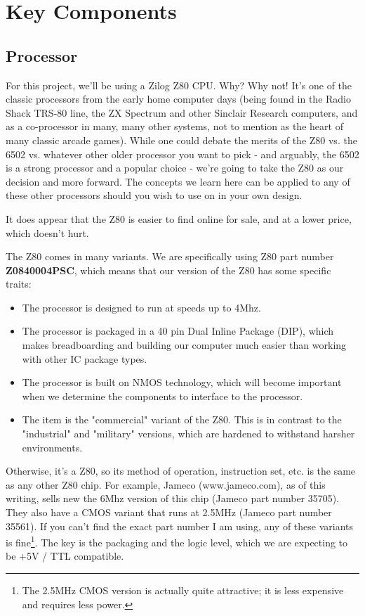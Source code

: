 \section{Key Components}

\subsection{Processor}
For this project, we'll be using a Zilog Z80 CPU. Why? Why not! It's one of the classic processors from the early home computer days (being found in the Radio Shack TRS-80 line, the ZX Spectrum and other Sinclair Research computers, and as a co-processor in many, many other systems, not to mention as the heart of many classic arcade games). While one could debate the merits of the Z80 vs. the 6502 vs. whatever other older processor you want to pick - and arguably, the 6502 is a strong processor and a popular choice - we're going to take the Z80 as our decision and more forward. The concepts we learn here can be applied to any of these other processors should you wish to use on in your own design.

It does appear that the Z80 is easier to find online for sale, and at a lower price, which doesn't hurt. 

The Z80 comes in many variants. We are specifically using Z80 part number \textbf{Z0840004PSC}, which means that our version of the Z80 has some specific traits:

\begin{itemize}
\item The processor is designed to run at speeds up to 4Mhz.
\item The processor is packaged in a 40 pin Dual Inline Package (DIP), which makes breadboarding and building our computer much easier than working with other IC package types.
\item The processor is built on NMOS technology, which will become important when we determine the components to interface to the processor.
\item The item is the "commercial" variant of the Z80. This is in contrast to the "industrial" and "military" versions, which are hardened to withstand harsher environments.
\end{itemize}

Otherwise, it's a Z80, so its method of operation, instruction set, etc. is the same as any other Z80 chip. For example, Jameco (www.jameco.com), as of this writing, sells new the 6Mhz version of this chip (Jameco part number 35705). They also have a CMOS variant that runs at 2.5MHz (Jameco part number 35561). If you can't find the exact part number I am using, any of these variants is fine\footnote{The 2.5MHz CMOS version is actually quite attractive; it is less expensive and requires less power.}. The key is the packaging and the logic level, which we are expecting to be +5V / TTL compatible. 

